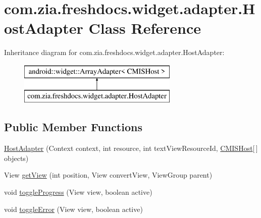 \hypertarget{classcom_1_1zia_1_1freshdocs_1_1widget_1_1adapter_1_1_host_adapter}{\section{com.\-zia.\-freshdocs.\-widget.\-adapter.\-Host\-Adapter Class Reference}
\label{classcom_1_1zia_1_1freshdocs_1_1widget_1_1adapter_1_1_host_adapter}
}
Inheritance diagram for com.\-zia.\-freshdocs.\-widget.\-adapter.\-Host\-Adapter\-:\begin{figure}[H]
\begin{center}
\leavevmode
\includegraphics[height=2.000000cm]{classcom_1_1zia_1_1freshdocs_1_1widget_1_1adapter_1_1_host_adapter}
\end{center}
\end{figure}
\subsection*{Public Member Functions}
\begin{DoxyCompactItemize}
\item 
\hyperlink{classcom_1_1zia_1_1freshdocs_1_1widget_1_1adapter_1_1_host_adapter_a15ef511a3129e2b7a9654bc0c75d74af}{Host\-Adapter} (Context context, int resource, int text\-View\-Resource\-Id, \hyperlink{classcom_1_1zia_1_1freshdocs_1_1preference_1_1_c_m_i_s_host}{C\-M\-I\-S\-Host}\mbox{[}$\,$\mbox{]} objects)
\item 
View \hyperlink{classcom_1_1zia_1_1freshdocs_1_1widget_1_1adapter_1_1_host_adapter_adc2523ed41cf4d0aa20f37e648f83b6e}{get\-View} (int position, View convert\-View, View\-Group parent)
\item 
void \hyperlink{classcom_1_1zia_1_1freshdocs_1_1widget_1_1adapter_1_1_host_adapter_a6869bcbc0859b389ad677f9bb6d5e0b9}{toggle\-Progress} (View view, boolean active)
\item 
void \hyperlink{classcom_1_1zia_1_1freshdocs_1_1widget_1_1adapter_1_1_host_adapter_ad2f5d0ede6b7bbcdc111521572dc18dc}{toggle\-Error} (View view, boolean active)
\end{DoxyCompactItemize}



